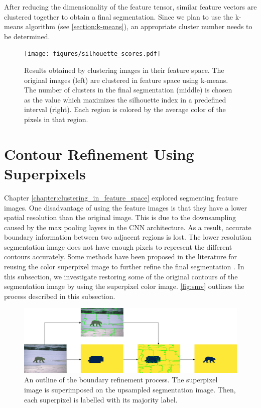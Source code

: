 After reducing the dimensionality of the feature tensor, similar feature vectors are clustered together to obtain a final segmentation. Since we plan to use the k-means algorithm (see \autoref{section:k-means}), an appropriate cluster number needs to be determined.

\begin{figure}[ht]
    \centering
    \texttt{[image: figures/silhouette\_scores.pdf]}
    \caption{Results obtained by clustering images in their feature space. The original images (left) are clustered in feature space using k-means. The number of clusters in the final segmentation (middle) is chosen as the value which maximizes the silhouette index in a predefined interval (right). Each region is colored by the average color of the pixels in that region.}
    \label{fig:silhouette_scores}
\end{figure}


\section{Contour Refinement Using Superpixels}

Chapter \ref{chapter:clustering_in_feature_space} explored segmenting feature images. One disadvantage of using the feature images is that they have a lower spatial resolution than the original image. This is due to the downsampling caused by the max pooling layers in the CNN architecture. As a result, accurate boundary information between two adjacent regions is lost. The lower resolution segmentation image does not have enough pixels to represent the different contours accurately. Some methods have been proposed in the literature for reusing the color superpixel image to further refine the final segmentation \parencite{ma2018fully}. In this subsection, we investigate restoring some of the original contours of the segmentation image by using the superpixel color image. \autoref{fig:smv} outlines the process described in this subsection.

\begin{figure}[ht]
    \centering
    \includegraphics[width=\linewidth]{figures/smv.pdf}
    \caption{An outline of the boundary refinement process. The superpixel image is superimposed on the upsampled segmentation image. Then, each superpixel is labelled with its majority label.}
    \label{fig:smv}
\end{figure}

